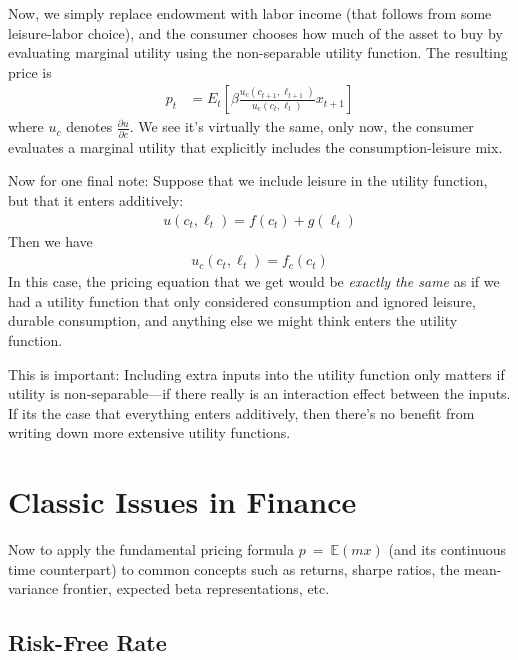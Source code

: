 \documentclass[12pt]{article}
\theoremstyle{plain}
\theoremstyle{definition}
\theoremstyle{remark}
\begin{document}
Now, we simply replace endowment with labor income (that follows from
some leisure-labor choice), and the consumer chooses how much of the
asset to buy by evaluating marginal utility using the non-separable
utility function. The resulting price is
\begin{align}
    p_t &= E_t\left[
  \beta\frac{u_c(c_{t+1},\ell_{t+1})}{u_c(c_{t},\ell_t)} x_{t+1} \right]
  \label{nonsep}
\end{align}
where $u_c$ denotes $\frac{\partial u}{\partial c}$. We see it's
virtually the same, only now, the consumer evaluates a marginal utility
that explicitly includes the consumption-leisure mix.

Now for one final note: Suppose that we include leisure in the utility function, but that it enters additively:
\begin{align*}
  u(c_t,\ell_t) = f(c_t) + g(\ell_t)
\end{align*}
Then we have
\begin{align*}
  u_c(c_t,\ell_t) = f_c(c_t)
\end{align*}
In this case, the pricing equation that we get would be \emph{exactly
the same} as if we had a utility function that only considered
consumption and ignored leisure, durable consumption, and anything else
we might think enters the utility function.

This is important: Including extra inputs into the utility function only
matters if utility is non-separable---if there really is an interaction
effect between the inputs. If its the case that everything enters
additively, then there's no benefit from writing down more extensive
utility functions.


\newpage
\section{Classic Issues in Finance}

Now to apply the fundamental pricing formula $p~=~\mathbb{E}(mx)$ (and
its continuous time counterpart) to common concepts such as returns,
sharpe ratios, the mean-variance frontier, expected beta
representations, etc.

\subsection{Risk-Free Rate}
\end{document}
